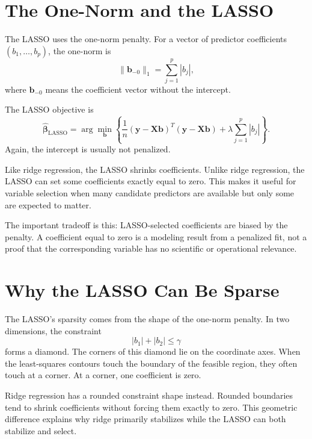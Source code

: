 \section{The One-Norm and the LASSO}

The LASSO uses the one-norm penalty.  For a vector of predictor coefficients \((b_1,\ldots,b_p)\), the one-norm is
\begin{equation}
  \|\mathbf{b}_{-0}\|_1 = \sum_{j=1}^{p}|b_j|,
\end{equation}
where \(\mathbf{b}_{-0}\) means the coefficient vector without the intercept.

The LASSO objective is
\begin{equation}
  \boxed{
  \widehat{\boldsymbol{\beta}}_{\mathrm{LASSO}}
  =\arg\min_{\mathbf{b}}
  \left\{
  \frac{1}{n}(\mathbf{y}-\mathbf{X}\mathbf{b})^T(\mathbf{y}-\mathbf{X}\mathbf{b})
  +\lambda\sum_{j=1}^{p}|b_j|
  \right\}.
  }
  \label{eq:ch16-lasso-objective}
\end{equation}
Again, the intercept is usually not penalized.

Like ridge regression, the LASSO shrinks coefficients.  Unlike ridge regression, the LASSO can set some coefficients exactly equal to zero.  This makes it useful for variable selection when many candidate predictors are available but only some are expected to matter.

The important tradeoff is this: LASSO-selected coefficients are biased by the penalty.  A coefficient equal to zero is a modeling result from a penalized fit, not a proof that the corresponding variable has no scientific or operational relevance.

\section{Why the LASSO Can Be Sparse}

The LASSO's sparsity comes from the shape of the one-norm penalty.  In two dimensions, the constraint
\begin{equation}
  |b_1|+|b_2|\leq \gamma
\end{equation}
forms a diamond.  The corners of this diamond lie on the coordinate axes.  When the least-squares contours touch the boundary of the feasible region, they often touch at a corner.  At a corner, one coefficient is zero.

Ridge regression has a rounded constraint shape instead.  Rounded boundaries tend to shrink coefficients without forcing them exactly to zero.  This geometric difference explains why ridge primarily stabilizes while the LASSO can both stabilize and select.

